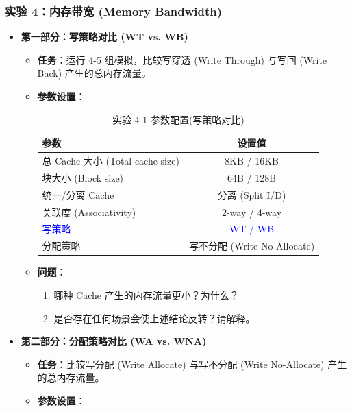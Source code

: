 \documentclass[12pt,a4paper]{article}
\begin{document}
\subsubsection{实验 4：内存带宽 (Memory Bandwidth)}
\begin{itemize}
    \item \textbf{第一部分：写策略对比 (WT vs. WB)}
    
    \begin{itemize}
        \item \textbf{任务}：运行 4-5 组模拟，比较写穿透 (Write Through) 与写回 (Write Back) 产生的总内存流量。
        \item \textbf{参数设置}：
    
    \begin{table}[H]
    \centering
    \small
    \begin{tabular}{lc}
    \toprule
    \textbf{参数} & \textbf{设置值} \\
    \midrule
    总 Cache 大小 (Total cache size) & 8KB / 16KB \\
    块大小 (Block size) & 64B / 128B \\
    统一/分离 Cache & 分离 (Split I/D) \\
    关联度 (Associativity) & 2-way / 4-way \\
    \textcolor{blue}{写策略} & \textcolor{blue}{WT / WB} \\
    分配策略 & 写不分配 (Write No-Allocate) \\
    \bottomrule
    \end{tabular}
    \caption{实验 4-1 参数配置(写策略对比)}
    \end{table}
        \item \textbf{问题}：
        \begin{enumerate}
            \item 哪种 Cache 产生的内存流量更小？为什么？
            \item 是否存在任何场景会使上述结论反转？请解释。
        \end{enumerate}
    \end{itemize}
    
    \item \textbf{第二部分：分配策略对比 (WA vs. WNA)}
    
    \begin{itemize}
        \item \textbf{任务}：比较写分配 (Write Allocate) 与写不分配 (Write No-Allocate) 产生的总内存流量。
        \item \textbf{参数设置}：
    

\end{itemize}
\end{itemize}
\end{document}
